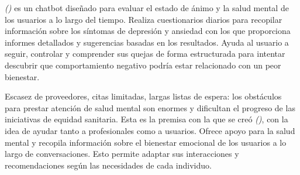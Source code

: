 {{{\textit{(\cite{moodpath})} es un chatbot diseñado para evaluar el estado de ánimo y la salud mental de los usuarios a lo largo del tiempo. Realiza cuestionarios diarios para recopilar información sobre los síntomas de depresión y ansiedad con los que proporciona informes detallados y sugerencias basadas en los resultados. Ayuda al usuario a seguir, controlar y comprender sus quejas de forma estructurada para intentar descubrir que comportamiento negativo podría estar relacionado con un peor bienestar. 

Escasez de proveedores, citas limitadas, largas listas de espera: los obstáculos para prestar atención de salud mental son enormes y dificultan el progreso de las iniciativas de equidad sanitaria. Esta es la premisa con la que se creó \textit{(\cite{woebot})}, con la idea de ayudar tanto a profesionales como a usuarios. Ofrece apoyo para la salud mental y recopila información sobre el bienestar emocional de los usuarios a lo largo de conversaciones. Esto permite adaptar sus interacciones y recomendaciones según las necesidades de cada individuo. 


}}}
